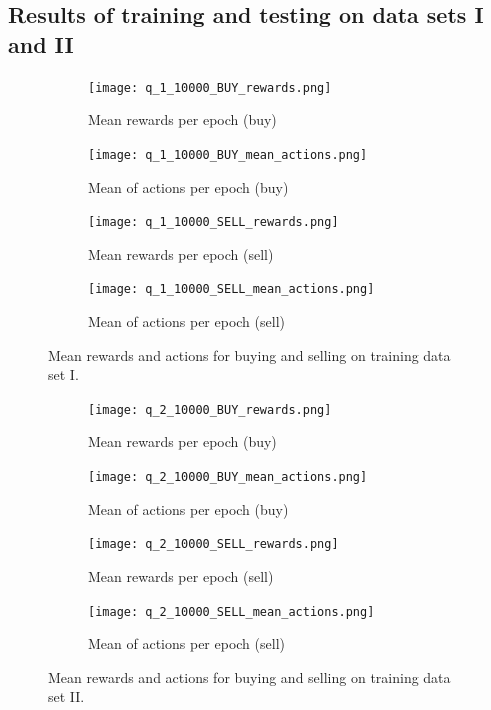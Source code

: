 \subsection{Results of training and testing on data sets I and II}

\begin{figure}
    \centering
    \begin{subfigure}[b]{0.4\textwidth}
        \texttt{[image: q\_1\_10000\_BUY\_rewards.png]}
        \caption{Mean rewards per epoch (buy)}
        \label{fig:analysis-q-learn-1-reward-buy}
    \end{subfigure}
    \begin{subfigure}[b]{0.4\textwidth}
        \texttt{[image: q\_1\_10000\_BUY\_mean\_actions.png]}
        \caption{Mean of actions per epoch (buy)}
        \label{fig:analysis-q-learn-1-action-buy}
    \end{subfigure}
    \begin{subfigure}[b]{0.4\textwidth}
        \texttt{[image: q\_1\_10000\_SELL\_rewards.png]}
        \caption{Mean rewards per epoch (sell)}
        \label{fig:analysis-q-learn-1-reward-sell}
    \end{subfigure}
    \begin{subfigure}[b]{0.4\textwidth}
        \texttt{[image: q\_1\_10000\_SELL\_mean\_actions.png]}
        \caption{Mean of actions per epoch (sell)}
        \label{fig:analysis-q-learn-1-action-sell}
    \end{subfigure}
    \caption{Mean rewards and actions for buying and selling on training data set I.}
    \label{fig:analysis-q-learn-1}
\end{figure}
\begin{figure}
    \centering
    \begin{subfigure}[b]{0.4\textwidth}
        \texttt{[image: q\_2\_10000\_BUY\_rewards.png]}
        \caption{Mean rewards per epoch (buy)}
        \label{fig:analysis-q-learn-2-reward-buy}
    \end{subfigure}
    \begin{subfigure}[b]{0.4\textwidth}
        \texttt{[image: q\_2\_10000\_BUY\_mean\_actions.png]}
        \caption{Mean of actions per epoch (buy)}
        \label{fig:analysis-q-learn-2-action-buy}
    \end{subfigure}
    \begin{subfigure}[b]{0.4\textwidth}
        \texttt{[image: q\_2\_10000\_SELL\_rewards.png]}
        \caption{Mean rewards per epoch (sell)}
        \label{fig:analysis-q-learn-2-reward-sell}
    \end{subfigure}
    \begin{subfigure}[b]{0.4\textwidth}
        \texttt{[image: q\_2\_10000\_SELL\_mean\_actions.png]}
        \caption{Mean of actions per epoch (sell)}
        \label{fig:analysis-q-learn-2-action-sell}
    \end{subfigure}
    \caption{Mean rewards and actions for buying and selling on training data set II.}
    \label{fig:analysis-q-learn-2}
\end{figure}


